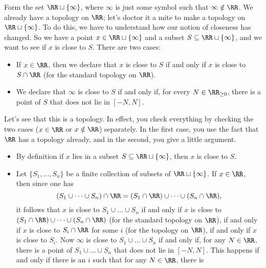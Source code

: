 \begin{exm}%
\label{exm:one_point_compactification_of_RR}
	Form the set $\RR\sqcup\{\infty\}$, where $\infty$ is just some symbol such that $\infty\notin\RR$.
	We already have a topology on $\RR$;
	let's doctor it a mite to make a topology on $\RR\sqcup\{\infty\}$.
	To do this, we have to understand how our notion of closeness has changed.
	So we have a point $x\in \RR\sqcup\{\infty\}$ and a subset $S\subseteq\RR\sqcup\{\infty\}$,
	and we want to see if $x$ is close to $S$.
	There are two cases:
	\begin{itemize}
		\item If $x\in\RR$, then we declare that $x$ is close to $S$ if and only if $x$ is close to $S\cap\RR$ (for the standard topology on $\RR$).
		\item We declare that $\infty$ is close to $S$ if and only if, for every $N\in\RR_{\geq 0}$, there is a point of $S$ that does not lie%
			in $[-N,N]$.
	\end{itemize}
	Let's see that this is a topology.
	In effect, you check everything by checking the two cases ($x\in\RR$ or $x\notin\RR$) separately.
	In the first case, you use the fact that $\RR$ has a topology already, and in the second, you give a little argument.
	\begin{itemize}
		\item By definition if $x$ lies in a subset $S\subseteq\RR\sqcup\{\infty\}$, then $x$ is close to $S$.
		\item Let $\{S_1,\dots,S_n\}$ be a finite collection of subsets of $\RR\sqcup\{\infty\}$.
		If $x\in \RR$, then since one has
		\[
		(S_1\cup\dots\cup S_n)\cap\RR=(S_1\cap\RR)\cup\dots\cup (S_n\cap\RR),
		\]
		it follows that $x$ is close to $S_1\cup\dots\cup S_n$ if and only if $x$ is close to $(S_1\cap\RR)\cup\dots\cup (S_n\cap\RR)$ (for the standard topology on $\RR$), if and only if $x$ is close to $S_i \cap \RR$ for some $i$ (for the topology on $\RR$), if and only if $x$ is close to $S_i$.
		Now $\infty$ is close to $S_1\cup\dots\cup S_n$ if and only if, for any $N\in\RR$, there is a point of $S_1\cup\dots\cup S_n$ that does not lie in $[-N,N]$.
		This happens if and only if there is an $i$ such that for any $N\in\RR$, there is%

\end{itemize}
\end{exm}
